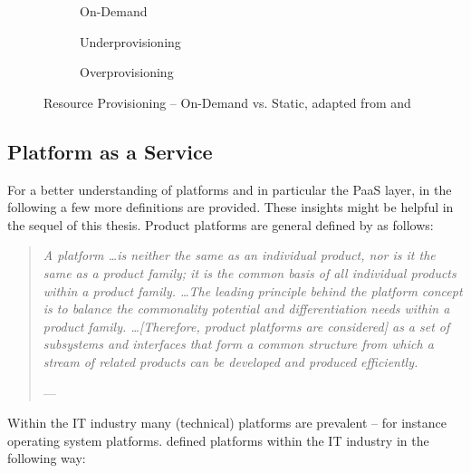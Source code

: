 \begin{figure}[bht]
	\centering
	\begin{subfigure}{.75\textwidth}
		\centering
		
		\caption{On-Demand}\label{fig:rpc}
	\end{subfigure}
	\begin{subfigure}[b]{.75\textwidth}
		\centering
		
		\caption{Underprovisioning}\label{fig:rpu}
	\end{subfigure}
	\begin{subfigure}[b]{.75\textwidth}
		\centering
		
		\caption{Overprovisioning}\label{fig:rpo}
	\end{subfigure}
	\caption[Resource Provisioning -- On-Demand vs. Static]{Resource Provisioning -- On-Demand vs. Static, adapted from \citet[p. 54]{Armbrust2010} and \citet[p. 127]{Iyer2010}}
	\label{fig:rp}
\end{figure}

\subsection{Platform as a Service}

For a better understanding of platforms and in particular the \ac{PaaS} layer, in the following a few more definitions are provided. These insights might be helpful in the sequel of this thesis. Product platforms are general defined by \citet{Halman2003} as follows:

\begin{quotation}{\slshape 
A platform \ldots is neither the same as an individual product, nor is it the same as a product family; it is the common basis of all individual products within a product family. \ldots The leading principle behind the platform concept is to balance the commonality potential and differentiation needs within a product family. \ldots [Therefore, product platforms are considered] as a set of subsystems and interfaces that form a common structure from which a stream of related products can be developed and produced efficiently.}
\vspace*{-7pt}
\begin{flushright}
	--- \citealp[pp. 150-151]{Halman2003}
\end{flushright}
\end{quotation}

Within the IT industry many (technical) platforms are prevalent -- for instance operating system platforms. \citet{Poel2007} defined platforms within the IT industry in the following way:

